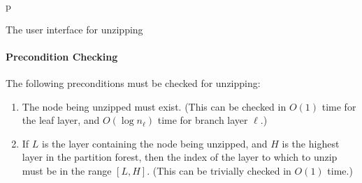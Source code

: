 \begin{stusubfig}{p}
	\hspace{8mm}%
	\\
	\hspace{8mm}%
\caption{The user interface for unzipping}
\label{fig:ipfs-forest-unzipping-gui}
\end{stusubfig}

\paragraph{Precondition Checking}

The following preconditions must be checked for unzipping:

\begin{enumerate}

\item The node being unzipped must exist. (This can be checked in $O(1)$ time for the leaf layer, and $O(\log n_\ell)$ time for branch layer $\ell$.)
\item If $L$ is the layer containing the node being unzipped, and $H$ is the highest layer in the partition forest, then the index of the layer to which to unzip must be in the range $[L,H]$. (This can be trivially checked in $O(1)$ time.)

\end{enumerate}

